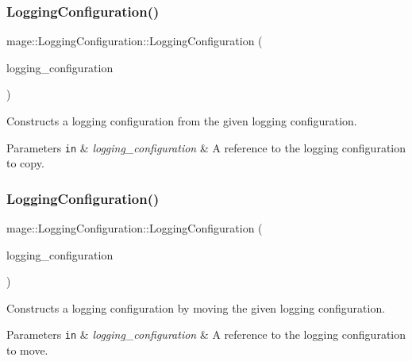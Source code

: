 \subsubsection{\texorpdfstring{Logging\+Configuration()}{LoggingConfiguration()}\hspace{0.1cm}{\footnotesize\ttfamily [2/3]}}
{\footnotesize\ttfamily mage\+::\+Logging\+Configuration\+::\+Logging\+Configuration (\begin{DoxyParamCaption}\item[{const \hyperlink{structmage_1_1_logging_configuration}{Logging\+Configuration} \&}]{logging\+\_\+configuration }\end{DoxyParamCaption})\hspace{0.3cm}{\ttfamily [default]}}

Constructs a logging configuration from the given logging configuration.


\begin{DoxyParams}[1]{Parameters}
\mbox{\tt in}  & {\em logging\+\_\+configuration} & A reference to the logging configuration to copy. \\
\hline
\end{DoxyParams}
\hypertarget{structmage_1_1_logging_configuration_ad5d3dd901720450fcf57d4b1b32fce15}{}\label{structmage_1_1_logging_configuration_ad5d3dd901720450fcf57d4b1b32fce15} 
\subsubsection{\texorpdfstring{Logging\+Configuration()}{LoggingConfiguration()}\hspace{0.1cm}{\footnotesize\ttfamily [3/3]}}
{\footnotesize\ttfamily mage\+::\+Logging\+Configuration\+::\+Logging\+Configuration (\begin{DoxyParamCaption}\item[{\hyperlink{structmage_1_1_logging_configuration}{Logging\+Configuration} \&\&}]{logging\+\_\+configuration }\end{DoxyParamCaption})\hspace{0.3cm}{\ttfamily [default]}}

Constructs a logging configuration by moving the given logging configuration.


\begin{DoxyParams}[1]{Parameters}
\mbox{\tt in}  & {\em logging\+\_\+configuration} & A reference to the logging configuration to move. \\
\hline
\end{DoxyParams}
\hypertarget{structmage_1_1_logging_configuration_a842cd1d5cf22c9fb6e2c76e684cd08ee}{}\label{structmage_1_1_logging_configuration_a842cd1d5cf22c9fb6e2c76e684cd08ee} 
